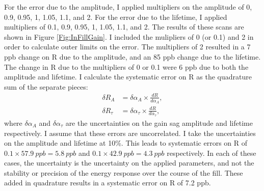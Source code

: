		For the error due to the amplitude, I applied multipliers on the amplitude of 0, 0.9, 0.95, 1, 1.05, 1.1, and 2. For the error due to the lifetime, I applied multipliers of 0.1, 0.9, 0.95, 1, 1.05, 1.1, and 2. The results of these scans are shown in Figure \ref{Fig:InFillGain}. I included the mulipliers of 0 (or 0.1) and 2 in order to calculate outer limits on the error. The multipliers of 2 resulted in a 7 ppb change on R due to the amplitude, and an 85 ppb change due to the lifetime. The change in R due to the multipliers of 0 or 0.1 were 6 ppb due to both the amplitude and lifetime. I calculate the systematic error on R as the quadrature sum of the separate pieces: 
		\begin{align}
			\delta R_{A} &= \delta\alpha_{A} \times \frac{dR}{d\alpha_{A}}, \\
			\delta R_{\tau} &= \delta\alpha_{\tau} \times \frac{dR}{d\alpha_{\tau}},
		\end{align}
		where $\delta\alpha_{A}$ and $\delta\alpha_{\tau}$ are the uncertainties on the gain sag amplitude and lifetime respectively. I assume that these errors are uncorrelated. I take the uncertainties on the amplitude and lifetime at 10\%. This leads to systematic errors on R of $0.1 \times \SI{57.9}{ppb} = \SI{5.8}{ppb}$ and $0.1 \times \SI{42.9}{ppb} = \SI{4.3}{ppb}$ respectively. In each of these cases, the uncertainty is the uncertainty on the applied parameters, and not the stability or precision of the energy response over the course of the fill. These added in quadrature results in a systematic error on R of 7.2 ppb.

